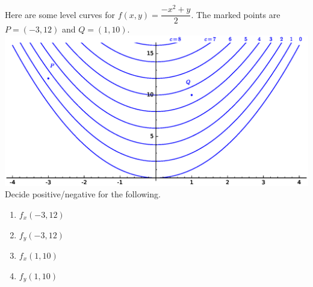 \begin{ex}
    Here are some level curves for $f(x,y)=\dfrac{-x^2+y}{2}.$ The marked points are $P=(-3,12)$ and $Q=(1,10)$.\\
    \mbox{} \hfill \includegraphics[width=.9\textwidth]{images/partial_deriv_intro.eps}\hfill \mbox{} \label{img:sage-level-curves}
    \\ Decide positive/negative for the following.
    \begin{multicols}{4}
    \begin{enumerate}
        \item $f_x(-3,12)$
        \item $f_y(-3,12)$
        \item $f_x(1,10)$ 
        \item $f_y(1,10)$
    \end{enumerate}
    \end{multicols}
\end{ex}

\pagebreak 



